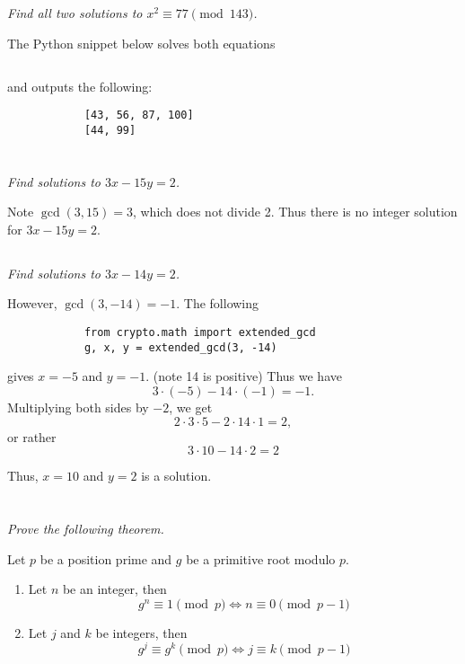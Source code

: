 \documentclass[12pt]{article}
\begin{document}
    \subsection{} \textit{Find all two solutions to $x^2 \equiv 77 \pmod{143}$.}

        The Python snippet below solves both equations

        \inputminted{python}{hw2_3.py}

        and outputs the following:

        \begin{verbatim}
            [43, 56, 87, 100]
            [44, 99]
        \end{verbatim}

\section{}
    \subsection{} \textit{Find solutions to $3x - 15y = 2$.}

        Note $\gcd(3, 15) = 3$, which does not divide 2. Thus there is no integer solution for $3x - 15y = 2$.
    \subsection{} \textit{Find solutions to $3x - 14y = 2$.}

        However, $\gcd(3, -14) = -1$. The following

        \begin{verbatim}
            from crypto.math import extended_gcd
            g, x, y = extended_gcd(3, -14)
        \end{verbatim}

        gives $x = -5$ and $y = -1$. (note 14 is positive) Thus we have $$3 \cdot (-5) - 14 \cdot (-1) = -1.$$ Multiplying both sides by $-2$, we get $$2 \cdot 3 \cdot 5 - 2 \cdot 14 \cdot 1 = 2,$$ or rather $$3 \cdot 10 - 14 \cdot 2 = 2$$

        Thus, $x = 10$ and $y = 2$ is a solution.

\section{} \textit{Prove the following theorem.}
    \begin{thm}
        Let $p$ be a position prime and $g$ be a primitive root modulo $p$.
        \begin{enumerate}
            \item Let $n$ be an integer, then $$g^n \equiv 1 \pmod{p} \Longleftrightarrow n \equiv 0 \pmod{p - 1}$$
            \item Let $j$ and $k$ be integers, then $$g^j \equiv g^k \pmod{p} \Longleftrightarrow j \equiv k \pmod{p - 1}$$
        \end{enumerate}
    \end{thm}
\end{document}
